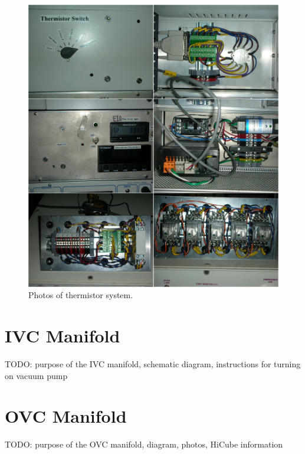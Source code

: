 \begin{figure}[!htbp]
 \centering
 \includegraphics[width=\textwidth]{./img/subsystem-thermistor-photos.png}
 \caption{Photos of thermistor system.}
 \label{fig:subsystem-thermistor-photos}
\end{figure}

\section{IVC Manifold}
TODO: purpose of the IVC manifold, schematic diagram, instructions for turning on vacuum pump

\section{OVC Manifold}
TODO: purpose of the OVC manifold, diagram, photos, HiCube information